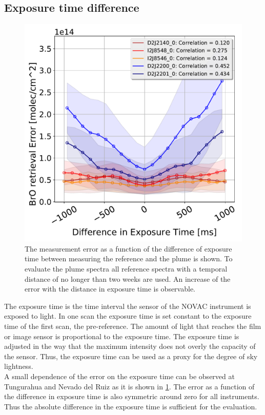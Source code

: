 \subsection{Exposure time difference}
\begin{figure}[h!]
    \centering
    \includegraphics[width=0.7\linewidth]{Bilder/DiffExpTimeallInstruments}
    \caption[The   measurement error as a function of the difference of exposure time between recording the reference and the plume.]{The   measurement error as a function of the difference of exposure time between measuring the reference and the plume is shown. To evaluate the plume spectra all reference spectra with a temporal distance of no longer than two weeks are used. An increase of the  error with the distance in exposure time is observable.}
    \label{fig:diffexptime}
\end{figure}
The exposure time is the time interval the sensor of the NOVAC instrument is exposed to light. In one scan the exposure time is set constant to the exposure time of the first scan, the pre-reference. The amount of light that reaches the film or image sensor is proportional to the exposure time. The exposure time is adjusted in the way that the maximum intensity does not overly the capacity of the sensor. Thus, the exposure time can be used as a proxy for the degree of sky lightness.\\
A small dependence of the  error on the exposure time can be observed at Tungurahua and Nevado del Ruiz as it is shown in \cref{fig:diffexptime}. The   error as a function of the difference in exposure time is also symmetric around zero for all instruments. Thus the absolute difference in the exposure time is sufficient for the evaluation.\\
